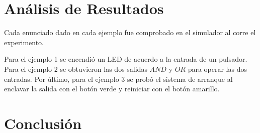\documentclass{article}
\begin{document}
    \section{Análisis de Resultados}\label{sec:análisis-de-resultados}


    Cada enunciado dado en cada ejemplo fue comprobado en el simulador al corre el experimento.

    \bigbreak

    Para el ejemplo 1 se encendió un LED de acuerdo a la entrada de un pulsador. Para el ejemplo 2 se obtuvieron las dos salidas $AND$ y $OR$ para operar las dos entradas. Por último, para el ejemplo 3 se probó el sistema de arranque al enclavar la salida con el botón verde y reiniciar con el botón amarillo.

    \section{Conclusión}\label{sec:conclusion}



    \printbibliography
\end{document}
